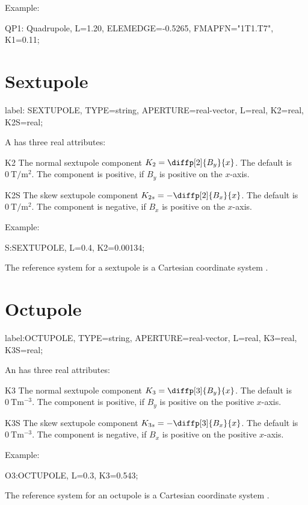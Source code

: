 \noindent Example:
\begin{example}
QP1: Quadrupole, L=1.20, ELEMEDGE=-0.5265,
     FMAPFN="1T1.T7", K1=0.11;
\end{example}




\clearpage
\section{Sextupole}
\label{sec:sextupole}
\begin{example}
label: SEXTUPOLE, TYPE=string, APERTURE=real-vector,
       L=real, K2=real, K2S=real;
\end{example}
A  has three real attributes:
\begin{kdescription}
\item[K2]
  The normal sextupole component
  $K_2=\diffp[2]{B_y}{x}$.
  The default is $\SI{0}{\tesla\per\square\meter}$.
  The component is positive, if $B_y$ is positive on the $x$-axis.
\item[K2S]
  The skew sextupole component
  $K_{2s}=-\diffp[2]{B_x}{x}$.
  The default is $\SI{0}{\tesla\per\square\meter}$.
  The component is negative, if $B_x$ is positive on the $x$-axis.
\end{kdescription}
\noindent Example:
\begin{example}
S:SEXTUPOLE, L=0.4, K2=0.00134;
\end{example}
The reference system for a sextupole is a Cartesian coordinate system
.


\clearpage
\section{Octupole}
\label{sec:octupole}
\begin{example}
label:OCTUPOLE, TYPE=string, APERTURE=real-vector,
      L=real, K3=real, K3S=real;
\end{example}
An  has three real attributes:
\begin{kdescription}
\item[K3]
  The normal sextupole component
  $K_3=\diffp[3]{B_y}{x}$.
  The default is $\SI{0}{\tesla\meter\tothe{-3}}$.
  The component is positive, if $B_y$ is positive on the positive $x$-axis.
\item[K3S]
  The skew sextupole component
  $K_{3s}=-\diffp[3]{B_x}{x}$.
  The default is $\SI{0}{\tesla\meter\tothe{-3}}$.
  The component is negative, if $B_x$ is positive on the positive $x$-axis.
\end{kdescription}
\noindent Example:
\begin{example}
O3:OCTUPOLE, L=0.3, K3=0.543;
\end{example}
The reference system for an octupole is a Cartesian coordinate system
.

